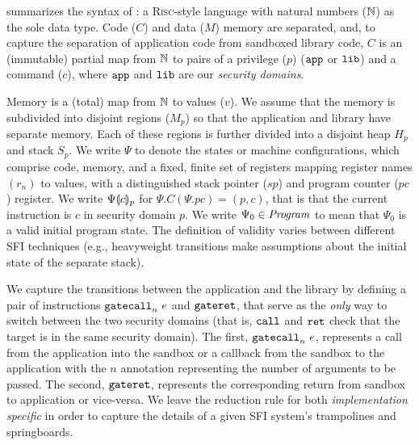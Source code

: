 %
summarizes the syntax of \langname{}:
a \textsc{Risc}-style language with natural
numbers ($\mathbb{N}$) as the sole data type.
%
Code ($C$) and data ($M$) memory are separated, and, to capture the separation
of application code from sandboxed library code, $C$ is an (immutable) partial
map from $\mathbb{N}$ to pairs of a privilege ($p$) ($\mathtt{app}$ or $\mathtt{lib}$) and
a command ($c$), where $\mathtt{app}$ and $\mathtt{lib}$ are our \emph{security
domains}.

%
Memory is a (total) map from $\mathbb{N}$
to values ($v$).
%
We assume that the memory is subdivided
into disjoint regions ($M_p$) so that
the application and library have separate memory.
%
Each of these regions is further divided
into a disjoint heap $H_p$ and stack $S_p$.
%
We write $\Psi$ to denote the states
or machine configurations, which comprise
code, memory, and a fixed, finite set of
registers mapping register names $(r_n)$
to values, with a distinguished stack
pointer ($sp$) and program counter ($pc$)
register.
%
We write ${\Psi}\llparenthesis{c}\rrparenthesis_{p}$
for $\Psi.C(\Psi.pc) = (p, c)$,
that is that the current instruction
is $c$ in security domain $p$.
%
We write $\Psi_0 \in \mathit{Program}$
to mean that $\Psi_0$ is a valid
initial program state.
%
The definition of validity varies between different SFI techniques (e.g.,
heavyweight transitions make assumptions about the initial state of the
separate stack).

%
We capture the transitions between the application and the library by defining a
pair of instructions $\mathtt{gatecall}_{n}\ {e}$ and $\mathtt{gateret}$, that serve as the
\emph{only} way to switch between the two security domains (that is,
$\mathtt{call}$ and $\mathtt{ret}$ check that the target is in the same security
domain).
%
The first, $\mathtt{gatecall}_{n}\ {e}$,
represents a call from the
application into the sandbox
or a callback from the sandbox
to the application with the $n$
annotation representing the number
of arguments to be passed.
%
The second, $\mathtt{gateret}$, represents
the corresponding return from sandbox
to application or vice-versa.
%
We leave the reduction rule for both
\emph{implementation specific} in order
to capture the details of a given SFI
system's trampolines and springboards.

